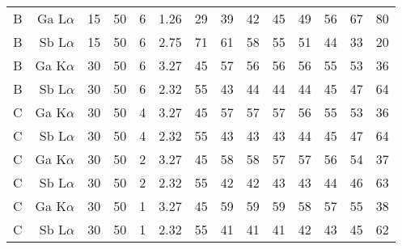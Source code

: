 \begin{table}[phtb]
\begin{center}
\begin{tabular}{rrrrrrrrrrrrrr}
            B            & Ga L$\alpha$  & 15             & 50             & 6           & 1.26              & 29             & 39           & 42            & 45             & 49             & 56             & 67            & 80             \\
            B            & Sb L$\alpha$  & 15             & 50             & 6           & 2.75              & 71             & 61           & 58            & 55             & 51             & 44             & 33            & 20             \\
            B            & Ga K$\alpha$  & 30             & 50             & 6           & 3.27              & 45             & 57           & 56            & 56             & 56             & 55             & 53            & 36             \\
            B            & Sb L$\alpha$  & 30             & 50             & 6           & 2.32              & 55             & 43           & 44            & 44             & 44             & 45             & 47            & 64             \\
            \hline
            C            & Ga K$\alpha$  & 30             & 50             & 4           & 3.27              & 45             & 57           & 57            & 57             & 56             & 55             & 53            & 36             \\
            C            & Sb L$\alpha$  & 30             & 50             & 4           & 2.32              & 55             & 43           & 43            & 43             & 44             & 45             & 47            & 64             \\
            C            & Ga K$\alpha$  & 30             & 50             & 2           & 3.27              & 45             & 58           & 58            & 57             & 57             & 56             & 54            & 37             \\
            C            & Sb L$\alpha$  & 30             & 50             & 2           & 2.32              & 55             & 42           & 42            & 43             & 43             & 44             & 46            & 63             \\
            C            & Ga K$\alpha$  & 30             & 50             & 1           & 3.27              & 45             & 59           & 59            & 59             & 58             & 57             & 55            & 38             \\
            C            & Sb L$\alpha$  & 30             & 50             & 1           & 2.32              & 55             & 41           & 41            & 41             & 42             & 43             & 45            & 62             \\

\end{tabular}
\end{center}
\end{table}

